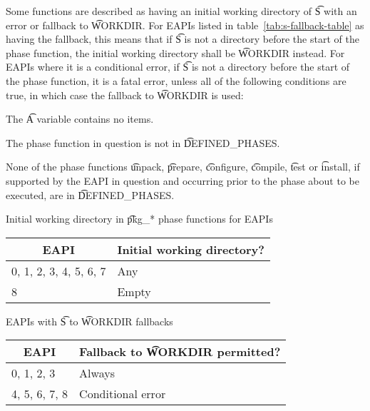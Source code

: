  Some functions are described as having an initial working
directory of \t{S} with an error or fallback to \t{WORKDIR}\@. For EAPIs listed in
table~\ref{tab:s-fallback-table} as having the fallback, this means that if \t{S} is not a directory
before the start of the phase function, the initial working directory shall be \t{WORKDIR} instead.
For EAPIs where it is a conditional error, if \t{S} is not a directory before the start of the phase
function, it is a fatal error, unless all of the following conditions are true, in which case the
fallback to \t{WORKDIR} is used:

\begin{compactitem}
\item The \t{A} variable contains no items.
\item The phase function in question is not in \t{DEFINED_PHASES}.
\item None of the phase functions \t{unpack}, \t{prepare}, \t{configure}, \t{compile}, \t{test} or
    \t{install}, if supported by the EAPI in question and occurring prior to the phase about to be
    executed, are in \t{DEFINED_PHASES}.
\end{compactitem}

\begin{centertable}{Initial working directory in \t{pkg_*} phase functions for EAPIs}
    \label{tab:function-dirs}
    \begin{tabular}{ll}
      \toprule
      \multicolumn{1}{c}{\textbf{EAPI}} &
      \multicolumn{1}{c}{\textbf{Initial working directory?}} \\
      \midrule
      0, 1, 2, 3, 4, 5, 6, 7  & Any   \\
      8                       & Empty \\
      \bottomrule
    \end{tabular}
\end{centertable}

\begin{centertable}{EAPIs with \t{S} to \t{WORKDIR} fallbacks}
    \label{tab:s-fallback-table}
    \begin{tabular}{ll}
      \toprule
      \multicolumn{1}{c}{\textbf{EAPI}} &
      \multicolumn{1}{c}{\textbf{Fallback to \t{WORKDIR} permitted?}} \\
      \midrule
      0, 1, 2, 3        & Always            \\
      4, 5, 6, 7, 8     & Conditional error \\
      \bottomrule
    \end{tabular}
\end{centertable}

